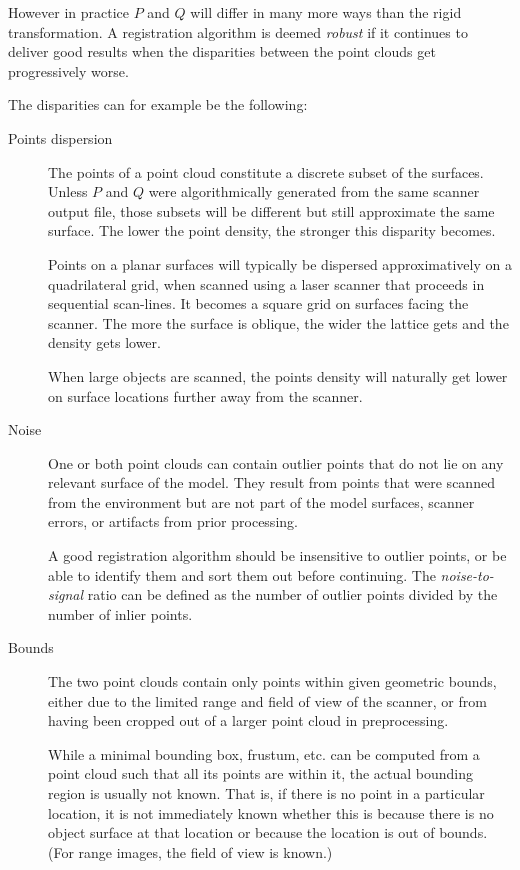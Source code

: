 However in practice $P$ and $Q$ will differ in many more ways than the rigid transformation. A registration algorithm is deemed \emph{robust} if it continues to deliver good results when the disparities between the point clouds get progressively worse.

The disparities can for example be the following:
\begin{description}
\item[Points dispersion] The points of a point cloud constitute a discrete subset of the surfaces. Unless $P$ and $Q$ were algorithmically generated from the same scanner output file, those subsets will be different but still approximate the same surface. The lower the point density, the stronger this disparity becomes.

Points on a planar surfaces will typically be dispersed approximatively on a quadrilateral grid, when scanned using a laser scanner that proceeds in sequential scan-lines. It becomes a square grid on surfaces facing the scanner. The more the surface is oblique, the wider the lattice gets and the density gets lower.

When large objects are scanned, the points density will naturally get lower on surface locations further away from the scanner. 

\item[Noise] One or both point clouds can contain outlier points that do not lie on any relevant surface of the model. They result from points that were scanned from the environment but are not part of the model surfaces, scanner errors, or artifacts from prior processing.

A good registration algorithm should be insensitive to outlier points, or be able to identify them and sort them out before continuing. The \emph{noise-to-signal} ratio can be defined as the number of outlier points divided by the number of inlier points.

\item[Bounds] The two point clouds contain only points within given geometric bounds, either due to the limited range and field of view of the scanner, or from having been cropped out of a larger point cloud in preprocessing.

While a minimal bounding box, frustum, etc. can be computed from a point cloud such that all its points are within it, the actual bounding region is usually not known. That is, if there is no point in a particular location, it is not immediately known whether this is because there is no object surface at that location or because the location is out of bounds. (For range images, the field of view is known.)


\end{description}
